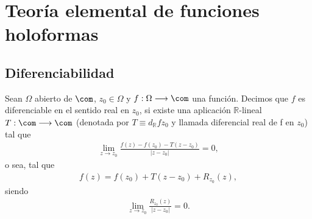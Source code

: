 \chapter{Teoría elemental de funciones holoformas}

\section{Diferenciabilidad}

\begin{defi}
Sean $\Omega$ abierto de $\com$, $z_0 \in \Omega$ y $f: \Omega \longrightarrow \com$ una función. Decimos que $f$ es diferenciable en el sentido real en $z_0$, si existe una aplicación $\mathbb{R}$-lineal $T : \com \longrightarrow \com$ (denotada por $T \equiv d_{\mathbb{R}}fz_0$ y llamada diferencial real de f en $z_0$) tal que
\begin{align*}
    \lim_{z \to z_0}{\frac{f(z) - f(z_0) - T(z-z_0)}{|z-z_0|} = 0},
\end{align*}
o sea, tal que
\begin{align*}
    f(z) = f(z_0) + T(z-z_0) + R_{z_0}(z),
\end{align*}
siendo
\begin{align*}
    \lim_{z \to z_0}{\frac{R_{z_0}(z)}{|z-z_0|} = 0}.
\end{align*}
\end{defi}

